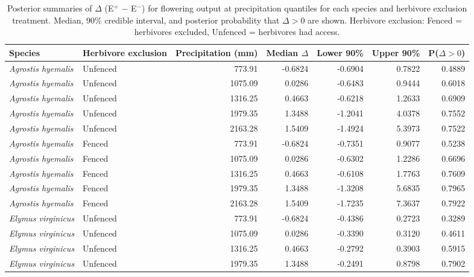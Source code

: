 \documentclass[12pt]{article}\usepackage[]{graphicx}\usepackage[dvipsnames]{xcolor}
\begin{document}
\begin{landscape}
\begin{table}[ht]
\centering
\caption[Summaries of $\Delta$ (E$^{+}$ $-$ E$^{-}$) for inflorescences across precipitation quantiles]{Posterior summaries of $\Delta$ (E$^{+}$ $-$ E$^{-}$) for flowering output at precipitation quantiles for each species and herbivore exclusion treatment. 
Median, 90\% credible interval, and posterior probability that $\Delta > 0$ are shown. 
Herbivore exclusion: Fenced = herbivores excluded, Unfenced = herbivores had access.}
\label{tab:delta_summary_flow}
\begin{tabular}{llrrrrr}
\hline
Species & Herbivore exclusion & Precipitation (mm) & Median $\Delta$  & Lower 90\% & Upper 90\% & P($\Delta>0$) \\
\hline
\textit{Agrostis hyemalis} & Unfenced & 773.91  & -0.6824  & -0.6904 & 0.7822 & 0.4889 \\
\textit{Agrostis hyemalis} & Unfenced & 1075.09 & 0.0286   & -0.6483 & 0.9444 & 0.6018 \\
\textit{Agrostis hyemalis} & Unfenced & 1316.25 & 0.4663   & -0.6218 & 1.2633 & 0.6909 \\
\textit{Agrostis hyemalis} & Unfenced & 1979.35 & 1.3488   & -1.2041 & 4.0378 & 0.7552 \\
\textit{Agrostis hyemalis} & Unfenced & 2163.28 & 1.5409   & -1.4924 & 5.3973 & 0.7522 \\
\textit{Agrostis hyemalis} & Fenced   & 773.91  & -0.6824  & -0.7351 & 0.9077 & 0.5238 \\
\textit{Agrostis hyemalis} & Fenced   & 1075.09 & 0.0286   & -0.6302 & 1.2286 & 0.6696 \\
\textit{Agrostis hyemalis} & Fenced   & 1316.25 & 0.4663   & -0.6108 & 1.7763 & 0.7609 \\
\textit{Agrostis hyemalis} & Fenced   & 1979.35 & 1.3488   & -1.3208 & 5.6835 & 0.7965 \\
\textit{Agrostis hyemalis} & Fenced   & 2163.28 & 1.5409   & -1.7235 & 7.3637 & 0.7922 \\
\textit{Elymus virginicus} & Unfenced & 773.91  & -0.6824  & -0.4386 & 0.2723 & 0.3289 \\
\textit{Elymus virginicus} & Unfenced & 1075.09 & 0.0286   & -0.3390 & 0.3120 & 0.4611 \\
\textit{Elymus virginicus} & Unfenced & 1316.25 & 0.4663   & -0.2792 & 0.3903 & 0.5915 \\
\textit{Elymus virginicus} & Unfenced & 1979.35 & 1.3488   & -0.2491 & 0.8798 & 0.7902 \\

\end{tabular}
\end{table}
\end{landscape}
\end{document}
